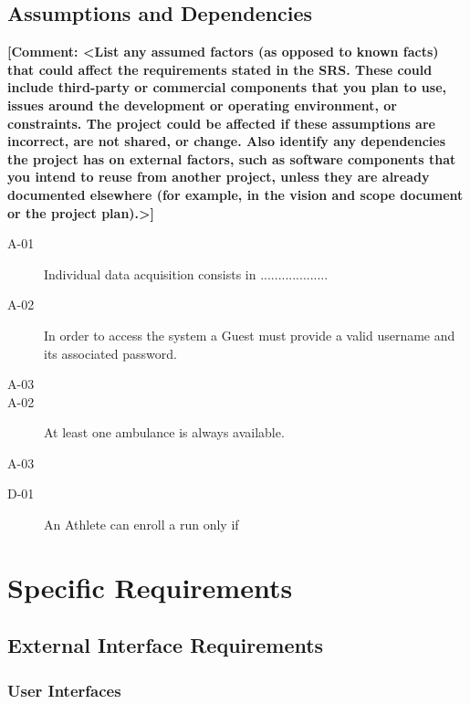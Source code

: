 \documentclass[a4paper]{article}
\newcommand{\comment}[1]{\textbf{[Comment: #1]}}
\begin{document}
    \subsection{Assumptions and Dependencies}
    \comment{<List any assumed factors (as opposed to known facts) that could affect the requirements stated in the SRS. These could include third-party or commercial components that you plan to use, issues around the development or operating environment, or constraints. The project could be affected if these assumptions are incorrect, are not shared, or change. Also identify any dependencies the project has on external factors, such as software components that you intend to reuse from another project, unless they are already documented elsewhere (for example, in the vision and scope document or the project plan).>}

        \begin{description}
        \item[A-01] Individual data acquisition consists in ...................
        \item[A-02] In order to access the system a Guest must provide a valid username and its associated password.
        \item[A-03]
        \item[A-02] At least one ambulance is always available.
        \item[A-03]
    \end{description}
    
        \begin{description}
            \item[D-01] An Athlete can enroll a run only if 
        \end{description}
        
\newpage
\section{Specific Requirements}

    \subsection{External Interface Requirements}
        
        \subsubsection{User Interfaces}
        
\end{document}
